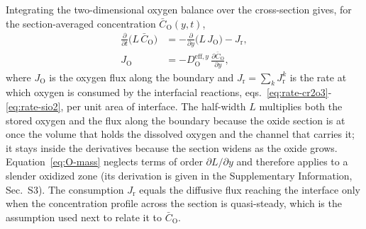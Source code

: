 \documentclass[3p,times]{elsarticle} %
\newcommand{\eff}{\mathrm{eff}}
\newcommand{\Ox}{\mathrm{O}}           %
\begin{document}
Integrating the two-dimensional oxygen balance over the cross-section gives,
for the section-averaged concentration \(\bar{C}_{\Ox}(y,t)\),
\begin{align}
\frac{\partial}{\partial t}\bigl(L\,\bar{C}_{\Ox}\bigr)
 &= -\frac{\partial}{\partial y}\bigl(L\,J_{\Ox}\bigr)-J_{\mathrm{r}},
\label{eq:O-mass}\\
J_{\Ox} &= -D_{\Ox}^{\eff,y}\,\frac{\partial \bar{C}_{\Ox}}{\partial y},
\label{eq:O-flux}
\end{align}
where \(J_{\Ox}\) is the oxygen flux along the boundary and
\(J_{\mathrm{r}}=\sum_k J_{\mathrm{r}}^{k}\) is the rate at which oxygen is
consumed by the interfacial reactions,
eqs.~\eqref{eq:rate-cr2o3}-\eqref{eq:rate-sio2}, per unit area of interface.
The half-width \(L\) multiplies both the stored oxygen and the flux along the
boundary because the oxide section is at once the volume that holds the
dissolved oxygen and the channel that carries it; it stays inside the
derivatives because the section widens as the oxide grows.
Equation~\eqref{eq:O-mass} neglects terms of order \(\partial L/\partial y\)
and therefore applies to a slender oxidized zone (its derivation is given in
the Supplementary Information, Sec.~S3). The consumption \(J_{\mathrm{r}}\)
equals the diffusive flux reaching the interface only when the concentration
profile across the section is quasi-steady, which is the assumption used next
to relate it to \(\bar{C}_{\Ox}\).
\end{document}
